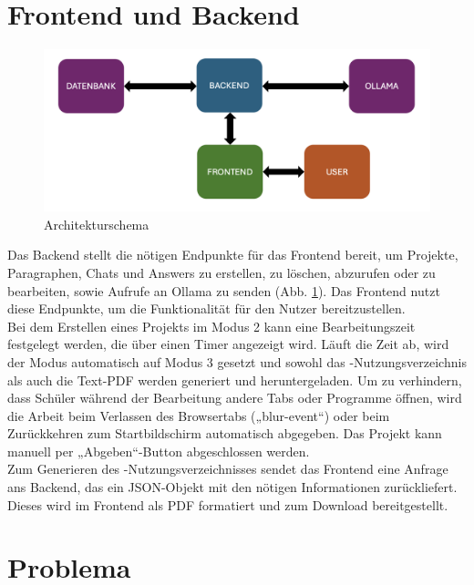 \documentclass[../main.tex]{subfiles}
\begin{document}
\section{Frontend und Backend}
\begin{figure}[h!]
  \includegraphics[scale=0.6]{bilder/Architektur.png}
  \caption{Architekturschema}
  \label{fig:architecture}
\end{figure}
Das Backend stellt die nötigen Endpunkte für das Frontend bereit, um Projekte, Paragraphen, Chats und Answers zu erstellen, zu löschen, abzurufen oder zu bearbeiten, sowie Aufrufe an Ollama 
zu senden (Abb. \ref{fig:architecture}). Das Frontend nutzt diese Endpunkte, um die Funktionalität für den Nutzer bereitzustellen.\\
Bei dem Erstellen eines Projekts im Modus 2 kann eine Bearbeitungszeit festgelegt werden, die über einen Timer angezeigt wird. Läuft die Zeit ab, wird der Modus automatisch auf Modus 3 gesetzt 
und sowohl das -Nutzungsverzeichnis als auch die Text-PDF werden generiert und heruntergeladen. Um zu verhindern, dass Schüler während der Bearbeitung andere Tabs 
oder Programme öffnen, wird die Arbeit beim Verlassen des Browsertabs („blur-event“)\cite{react-onblur} oder beim Zurückkehren zum Startbildschirm automatisch abgegeben. Das Projekt 
kann manuell per „Abgeben“-Button abgeschlossen werden.\\
Zum Generieren des -Nutzungsverzeichnisses sendet das Frontend eine Anfrage ans Backend, das ein JSON-Objekt mit den nötigen Informationen zurückliefert. 
Dieses wird im Frontend als PDF formatiert und zum Download bereitgestellt.


\section{Problema}
\end{document}
